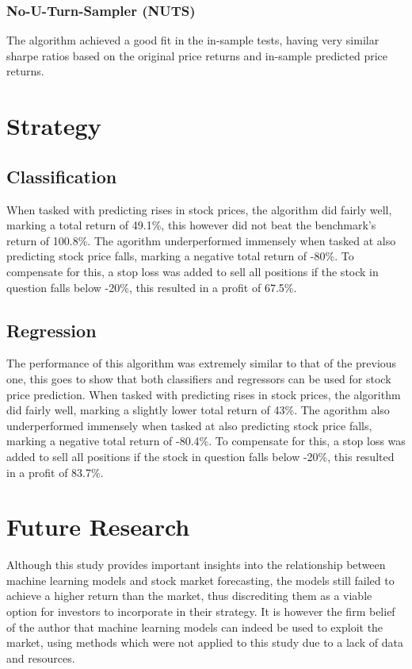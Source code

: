\subsubsection{No-U-Turn-Sampler (NUTS)}
The algorithm achieved a good fit in the in-sample tests, having very similar sharpe ratios  based on the original price returns and in-sample predicted price returns.

\section{Strategy}

\subsection{Classification}
When tasked with predicting rises in stock prices, the algorithm did fairly well, marking a total return of 49.1\%, this however did not beat the benchmark's return of 100.8\%. The agorithm underperformed immensely when tasked at also predicting stock price falls, marking a negative total return of -80\%. To compensate for this, a stop loss was added to sell all positions if the stock in question falls below -20\%, this resulted in a profit of 67.5\%.

\subsection{Regression}
The performance of this algorithm was extremely similar to that of the previous one, this goes to show that both classifiers and regressors can be used for stock price prediction. When tasked with predicting rises in stock prices, the algorithm did fairly well, marking a slightly lower total return of 43\%. The agorithm also underperformed immensely when tasked at also predicting stock price falls, marking a negative total return of -80.4\%. To compensate for this, a stop loss was added to sell all positions if the stock in question falls below -20\%, this resulted in a profit of 83.7\%.

\section{Future Research}
Although this study provides important insights into the relationship between machine learning models and stock market forecasting, the models still failed to achieve a higher return than the market, thus discrediting them as a viable option for investors to incorporate in their strategy. It is however the firm belief of the author that machine learning models can indeed be used to exploit the market, using methods which were not applied to this study due to a lack of data and resources. 

